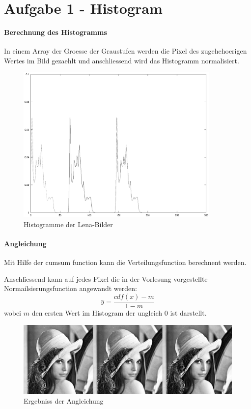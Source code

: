 



\newcommand{\nr}{6}
\lstset{language=matlab}


\section*{Aufgabe 1 - Histogram}
\paragraph{Berechnung des Histogramms}
In einem Array der Groesse der Graustufen werden die Pixel des zugehehoerigen
Wertes im Bild gezaehlt und anschliessend wird das Histogramm normalisiert.

\begin{figure}[H]
\begin{center}
\includegraphics[width=100mm]{u06/task1-hist.eps}
\end{center}
\caption{Histogramme der Lena-Bilder}
\end{figure}

\paragraph{Angleichung}
Mit Hilfe der cumsum function kann die Verteilungsfunction berechnent werden.

Anschliessend kann auf jedes Pixel die in der Vorlesung vorgestellte Normailsierungsfunction angewandt werden:
\begin{equation}
y = \frac{cdf(x) - m}{1 - m}
\end{equation}
wobei $m$ den ersten Wert im Histogram der ungleich 0 ist darstellt.

\begin{figure}[H]
\begin{center}
\includegraphics[width=150mm]{u06/task1-eq.eps}
\end{center}
\caption{Ergebniss der Angleichung}
\end{figure}

